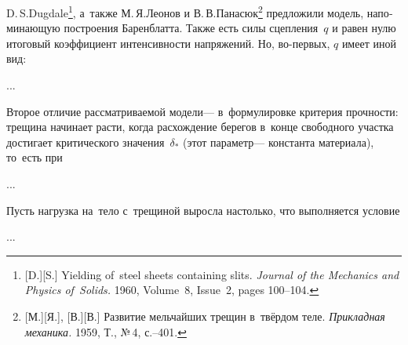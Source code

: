 
\begin{otherlanguage}{russian}

D.\,S.\;Dugdale\footnote{[D.][S.] Yielding of~steel sheets containing slits. \emph{Journal of the Mechanics and Physics of~Solids.} 1960, Volume~8, Issue~2, pages 100\hbox{--}104.
}\hspace{-0.4ex}, а~также М.\,Я.\;Леонов и В.\,В.\;Панасюк\footnote{[М.][Я.], [В.][В.] Развитие мельчайших трещин в~твёрдом теле. \emph{Прикладная механика.} 1959, Т., №\,4, с.\hbox{--}401.} предложили модель, напоминающую построения Баренблатта.
Также есть силы сцепления~$q$ и равен нулю итоговый коэффициент интенсивности напряжений.
Но, во\hbox{-}первых, $q$ имеет иной вид:

...

Второе отличие рассматриваемой модели\:---
в~формулировке критерия прочности:
трещина начинает расти,
когда расхождение берегов
в~конце свободного участка
достигает критического значения~$\delta_{*}$
(этот параметр\:--- константа материала),
то~есть при

...



\end{otherlanguage}



\begin{otherlanguage}{russian}

Пусть нагрузка на~тело с~трещиной выросла настолько, что выполняется условие

...



\end{otherlanguage}


